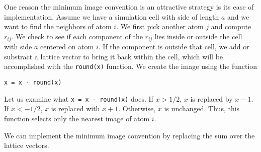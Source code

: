 \documentclass[11pt]{article}
\begin{document}
One reason the minimum image convention is an attractive strategy is its
ease of implementation. Assume we have a simulation cell with side of
length \(a\) and we want to find the neighbors of atom \(i\). We first
pick another atom \(j\) and compute \(r_{ij}\). We check to see if each
component of the \(r_{ij}\) lies inside or outside the cell with side
\(a\) centered on atom \(i\). If the component is outside that cell, we
add or substract a lattice vector to bring it back within the cell,
which will be accomplished with the \texttt{round(x)} function. We
create the image using the function

\texttt{x\ =\ x\ -\ round(x)}

Let us examine what \texttt{x\ =\ x\ -\ round(x)} does. If \(x > 1/2\),
\(x\) is replaced by \(x-1\). If \(x<-1/2\), \(x\) is replaced with
\(x+1\). Otherwise, \(x\) is unchanged. Thus, this function selects only
the nearest image of atom \(i\).

We can implement the minimum image convention by replacing the sum over
the lattice vectors.
\end{document}
